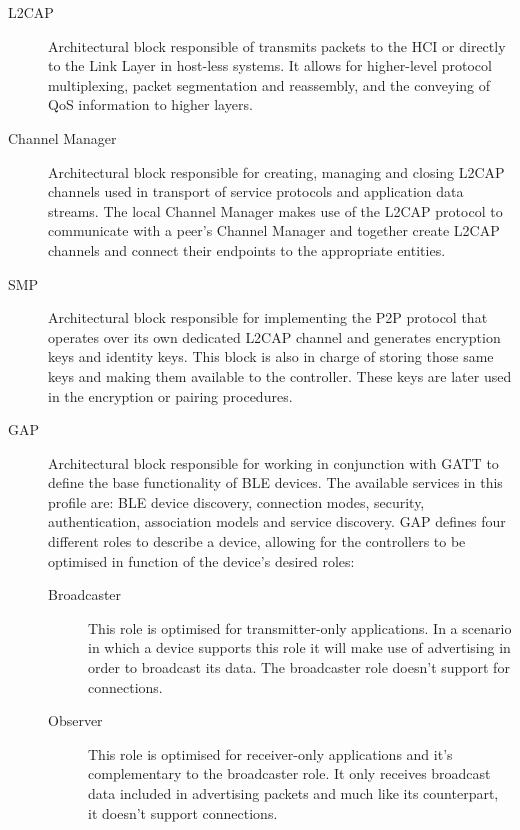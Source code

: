 \begin{description}
\item[\ac{L2CAP}] Architectural block responsible of transmits packets to the \ac{HCI} or directly to the Link Layer in host-less systems. It allows for higher-level protocol multiplexing, packet segmentation and reassembly, and the conveying of \ac{QoS} information to higher layers.

 
\item[Channel Manager] Architectural block responsible for creating, managing and closing \ac{L2CAP} channels used in transport of service protocols and application data streams. The local Channel Manager makes use of the \ac{L2CAP} protocol to communicate with a peer's Channel Manager and together create \ac{L2CAP} channels and connect their endpoints to the appropriate entities.


\item[\ac{SMP}] Architectural block responsible for implementing the \ac{P2P} protocol that operates over its own dedicated \ac{L2CAP} channel and generates encryption keys and identity keys. This block is also in charge of storing those same keys and making them available to the controller. These keys are later used in the encryption or pairing procedures.


\item[\ac{GAP}] Architectural block responsible for working in conjunction with \ac{GATT} to define the base functionality of \ac{BLE} devices. The available services in this profile are: \ac{BLE} device discovery, connection modes, security, authentication, association models and service discovery.
\ac{GAP} defines four different roles to describe a device, allowing for the controllers to be optimised in function of the device's desired roles:
\begin{description}
	\item[]

	\item[Broadcaster] This role is optimised for transmitter-only applications. In a scenario in which a device supports this role it will make use of advertising in order to broadcast its data. The broadcaster role doesn't support for connections.
 
 
	\item[Observer] This role is optimised for receiver-only applications and it's complementary to the broadcaster role. It only receives broadcast data included in advertising packets and much like its counterpart, it doesn't support connections.
 


\end{description}
\end{description}

